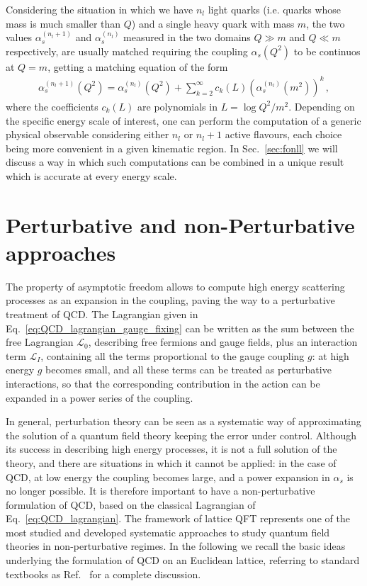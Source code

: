 %
Considering the situation in which we have $n_l$ light quarks (i.e. quarks whose mass is much smaller than $Q$)
and a single heavy quark with mass $m$, the two values $\alpha_s^{(n_l+1)}$ and $\alpha_s^{(n_l)}$ 
measured in the two domains $Q \gg m$ and $Q \ll m$ respectively,
are usually matched requiring  the coupling $\alpha_s\left(Q^2\right)$
to be continuos at $Q=m$, getting a matching equation of the form
\begin{align}
    \alpha_s^{(n_l+1)}\left(Q^2\right) = 
    \alpha_s^{(n_l)}\left(Q^2\right) 
    + \sum_{k=2}^{\infty} c_k\left(L\right) \left(\alpha_s^{(n_l)}\left(m^2\right)\right)^k\,,
\end{align}
where the coefficients $c_k\left(L\right)$ are  polynomials in $L=\log Q^2/m^2$.
Depending on the specific energy scale of interest,
one can perform the computation of a generic physical observable considering either $n_l$ or $n_l + 1$ active flavours,
each choice being more convenient in a given kinematic region. 
In Sec.~\ref{sec:fonll} we will discuss a way in which such computations can be combined in a unique result which
is accurate at every energy scale.

\section{Perturbative and non-Perturbative approaches}
The property of asymptotic freedom allows to compute high energy scattering processes as
an expansion in the coupling, paving the way to a perturbative treatment of QCD.
The Lagrangian given in Eq.~\eqref{eq:QCD_lagrangian_gauge_fixing}
can be written as the sum between the free Lagrangian $\mathcal{L}_0$, describing free fermions and gauge fields, 
plus an interaction term $\mathcal{L}_I$, containing all the terms proportional to the gauge coupling $g$:
at high energy $g$ becomes small, and all these terms 
can be treated as perturbative interactions, so that the corresponding
contribution in the action can be expanded in a power series of the coupling.

%
In general, perturbation theory can be seen as a systematic way of approximating the solution 
of a quantum field theory keeping the error under control.
Although its success in describing high energy processes, it is not a full solution of the theory, 
and there are situations in which it cannot be applied: in the case of QCD, at low energy the coupling
becomes large, and a power expansion in $\alpha_s$ is no longer possible. 
It is therefore important to have a non-perturbative formulation of QCD, based on the classical Lagrangian 
of Eq.~\eqref{eq:QCD_lagrangian}.
The framework of lattice QFT represents one of the most studied and developed systematic approaches to study quantum
field theories in non-perturbative regimes. In the following we recall the basic ideas underlying the formulation of 
QCD on an Euclidean lattice, referring to standard textbooks as Ref.~\cite{smit_2002} for a complete discussion.

